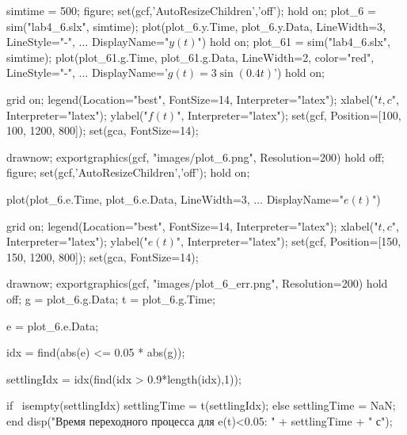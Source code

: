 

\begin{matlabcode}
simtime = 500;
figure;
set(gcf,'AutoResizeChildren','off');
hold on;
plot_6 = sim("lab4_6.slx", simtime);
plot(plot_6.y.Time, plot_6.y.Data, LineWidth=3, LineStyle="-", ...
            DisplayName="$y(t)$")
hold on;
plot_61 = sim("lab4_6.slx", simtime);
plot(plot_61.g.Time, plot_61.g.Data, LineWidth=2, color="red", LineStyle="-", ...
            DisplayName='$g(t)=3\sin(0.4t)$')
hold on;

grid on;
legend(Location="best", FontSize=14, Interpreter="latex");
xlabel("$t, c$", Interpreter="latex");
ylabel("$f(t)$", Interpreter="latex");
set(gcf, Position=[100, 100, 1200, 800]);
set(gca, FontSize=14);

drawnow;
exportgraphics(gcf, "images/plot_6.png", Resolution=200)
hold off;
figure;
set(gcf,'AutoResizeChildren','off');
hold on;

plot(plot_6.e.Time, plot_6.e.Data, LineWidth=3, ...
            DisplayName="$e(t)$")

grid on;
legend(Location="best", FontSize=14, Interpreter="latex");
xlabel("$t, c$", Interpreter="latex");
ylabel("$e(t)$", Interpreter="latex");
set(gcf, Position=[150, 150, 1200, 800]);
set(gca, FontSize=14);

drawnow;
exportgraphics(gcf, "images/plot_6_err.png", Resolution=200)
hold off;
g = plot_6.g.Data;
t = plot_6.g.Time;

e = plot_6.e.Data;

idx = find(abs(e) <= 0.05 * abs(g));

settlingIdx = idx(find(idx > 0.9*length(idx),1));

if ~isempty(settlingIdx)
    settlingTime = t(settlingIdx);
else
    settlingTime = NaN;
end
disp("Время переходного процесса для e(t)<0.05: " + settlingTime + " с");
\end{matlabcode}




